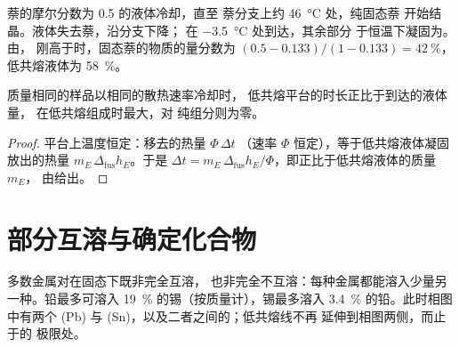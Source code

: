 \begin{example}[苯–萘混合物的冷却]\label{ex:b2:solid-liquid-diagrams:naphthalene}
萘的摩尔分数为 0.5 的液体冷却，直至
萘分支上约 \qty{46}{\degreeCelsius} 处，纯固态萘
开始结晶。液体失去萘，沿分支下降；
在 \qty{-3.5}{\degreeCelsius} 处到达，其余部分
于恒温下凝固为。由，
刚高于时，固态萘的物质的量分数为 $(0.5 - 0.133)/(1 - 0.133) =
42~\%$，低共熔液体为 58~\%。
\end{example}

\begin{proposition}[低共熔平台的长度]\label{prop:b2:solid-liquid-diagrams:plateau-length}
质量相同的样品以相同的散热速率冷却时，
低共熔平台的时长正比于到达的液体量，
在低共熔组成时最大，对
纯组分则为零。
\end{proposition}

\begin{proof}
平台上温度恒定：移去的热量 $\Phi\,\Delta t$
（速率 $\Phi$ 恒定），等于低共熔液体凝固放出的热量
$m_E\,\Delta_{\text{fus}}h_E$。于是 $\Delta t = m_E\,\Delta_{\text{fus}}h_E/
\Phi$，即正比于低共熔液体的质量 $m_E$，
由给出。
\end{proof}

\section{部分互溶与确定化合物}

多数金属对在固态下既非完全互溶，
也非完全不互溶：每种金属都能溶入少量另一种。铅最多可溶入
19~\% 的锡（按质量计），锡最多溶入 3.4~\% 的铅。此时相图中有两个
(Pb) 与 (Sn)，以及二者之间的；低共熔线不再
延伸到相图两侧，而止于的
极限处。

